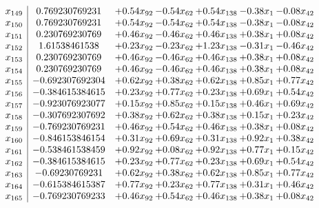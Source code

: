 \documentclass[8pt]{article}
\begin{document}
\[\begin{array}{c| c c@{\hskip 2pt} c@{\hskip 2pt} c@{\hskip 2pt} c@{\hskip 2pt} c@{\hskip 2pt} }
 x_{149}   &  0.769230769231 & +  0.54 x_{92} & -0.54 x_{62} & +  0.54 x_{138} & -0.38 x_{1} & -0.08 x_{42}\\
 x_{150}   &  0.769230769231 & +  0.54 x_{92} & -0.54 x_{62} & +  0.54 x_{138} & -0.38 x_{1} & -0.08 x_{42}\\
 x_{151}   &  0.230769230769 & +  0.46 x_{92} & -0.46 x_{62} & +  0.46 x_{138} & +  0.38 x_{1} & +  0.08 x_{42}\\
 x_{152}   &  1.61538461538 & +  0.23 x_{92} & -0.23 x_{62} & +  1.23 x_{138} & -0.31 x_{1} & -0.46 x_{42}\\
 x_{153}   &  0.230769230769 & +  0.46 x_{92} & -0.46 x_{62} & +  0.46 x_{138} & +  0.38 x_{1} & +  0.08 x_{42}\\
 x_{154}   &  0.230769230769 & +  0.46 x_{92} & -0.46 x_{62} & +  0.46 x_{138} & +  0.38 x_{1} & +  0.08 x_{42}\\
 x_{155}   &  -0.692307692304 & +  0.62 x_{92} & +  0.38 x_{62} & +  0.62 x_{138} & +  0.85 x_{1} & +  0.77 x_{42}\\
 x_{156}   &  -0.384615384615 & +  0.23 x_{92} & +  0.77 x_{62} & +  0.23 x_{138} & +  0.69 x_{1} & +  0.54 x_{42}\\
 x_{157}   &  -0.923076923077 & +  0.15 x_{92} & +  0.85 x_{62} & +  0.15 x_{138} & +  0.46 x_{1} & +  0.69 x_{42}\\
 x_{158}   &  -0.307692307692 & +  0.38 x_{92} & +  0.62 x_{62} & +  0.38 x_{138} & +  0.15 x_{1} & +  0.23 x_{42}\\
 x_{159}   &  -0.769230769231 & +  0.46 x_{92} & +  0.54 x_{62} & +  0.46 x_{138} & +  0.38 x_{1} & +  0.08 x_{42}\\
 x_{160}   &  -0.846153846154 & +  0.31 x_{92} & +  0.69 x_{62} & +  0.31 x_{138} & +  0.92 x_{1} & +  0.38 x_{42}\\
 x_{161}   &  -0.538461538459 & +  0.92 x_{92} & +  0.08 x_{62} & +  0.92 x_{138} & +  0.77 x_{1} & +  0.15 x_{42}\\
 x_{162}   &  -0.384615384615 & +  0.23 x_{92} & +  0.77 x_{62} & +  0.23 x_{138} & +  0.69 x_{1} & +  0.54 x_{42}\\
 x_{163}   &  -0.69230769231 & +  0.62 x_{92} & +  0.38 x_{62} & +  0.62 x_{138} & +  0.85 x_{1} & +  0.77 x_{42}\\
 x_{164}   &  -0.615384615387 & +  0.77 x_{92} & +  0.23 x_{62} & +  0.77 x_{138} & +  0.31 x_{1} & +  0.46 x_{42}\\
 x_{165}   &  -0.769230769233 & +  0.46 x_{92} & +  0.54 x_{62} & +  0.46 x_{138} & +  0.38 x_{1} & +  0.08 x_{42}\\

\end{array}\]
\end{document}
